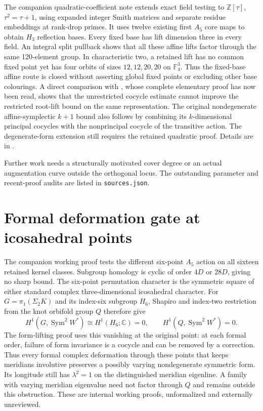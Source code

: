 \documentclass[11pt]{article}
\begin{document}
The companion quadratic-coefficient note extends exact field testing
to $\mathbb Z[\tau]$, $\tau^2=\tau+1$, using expanded integer Smith
matrices and separate residue embeddings at rank-drop primes. It
uses twelve existing first $A_5$ core maps to obtain $H_3$ reflection
bases. Every fixed base has lift dimension three in every field.
An integral split pullback shows that all these affine lifts factor
through the same 120-element group. In characteristic two, a retained
lift has no common fixed point yet has four orbits of sizes
$12,12,20,20$ on $\mathbb F_4^3$. Thus the fixed-base affine route is
closed without asserting global fixed points or excluding other
base colourings. A direct comparison with \cite[Lemma 6.2]{whitehead},
whose complete elementary proof has now been read, shows that the
unrestricted cocycle estimate cannot improve the restricted root-lift
bound on the same representation.
The original nondegenerate affine-symplectic $k+1$ bound also follows
by combining its $k$-dimensional principal cocycles with the
nonprincipal cocycle of the transitive action. The degenerate-form
extension still requires the retained quadratic proof. Details are in
.

Further work needs a structurally motivated cover degree or an actual
augmentation curve outside the orthogonal locus. The outstanding
parameter and recent-proof audits are listed in \texttt{sources.json}.

\section{Formal deformation gate at icosahedral points}

The companion working proof
 tests the
different six-point $A_5$ action on all sixteen retained kernel
classes. Subgroup homology is cyclic of order $4D$ or $28D$,
giving no sharp bound. The six-point permutation character is the
symmetric square of either standard complex three-dimensional
icosahedral character. For $G=\pi_1(\Sigma_2K)$ and its index-six
subgroup $H_6$, Shapiro and index-two restriction from the knot
orbifold group $Q$ therefore give
\[
 H^1(G,\operatorname{Sym}^2W^*)\cong H^1(H_6;\mathbb C)=0,
 \qquad H^1(Q,\operatorname{Sym}^2W^*)=0.
\]
The form-lifting proof uses this vanishing at the original point:
at each formal order, failure of form invariance is a cocycle and
can be removed by a correction. Thus every formal complex
deformation through these points that keeps meridians involutive
preserves a possibly varying nondegenerate symmetric form. Its
longitude still has $\lambda^2=1$ on the distinguished meridian
eigenline. A family with varying meridian eigenvalue need not factor
through $Q$ and remains outside this obstruction. These are internal
working proofs, unformalized and externally unreviewed.
\end{document}
